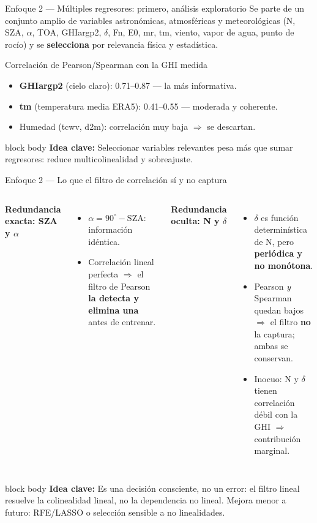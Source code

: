 \documentclass[aspectratio=169,11pt]{beamer}
\newcommand{\clave}[1]{%
  \begin{beamercolorbox}[wd=\linewidth,sep=6pt,rounded=true]{block body}%
    \footnotesize\textbf{\color{primary}Idea clave: }#1%
  \end{beamercolorbox}}
\begin{document}
\begin{frame}{Enfoque 2 — Múltiples regresores: primero, análisis exploratorio}
  \footnotesize
  Se parte de un conjunto amplio de variables astronómicas, atmosféricas y meteorológicas (N, SZA, $\alpha$, TOA, GHIargp2, $\delta$, Fn, E0, mr, tm, viento, vapor de agua, punto de rocío) y se \textbf{selecciona} por relevancia física y estadística.
  \vspace{0.4em}
  \begin{block}{Correlación de Pearson/Spearman con la GHI medida}
    \scriptsize
    \begin{itemize}
      \item \textbf{GHIargp2} (cielo claro): 0.71–0.87 — la más informativa.
      \item \textbf{tm} (temperatura media ERA5): 0.41–0.55 — moderada y coherente.
      \item Humedad (tcwv, d2m): correlación muy baja $\Rightarrow$ se descartan.
    \end{itemize}
  \end{block}
  \clave{Seleccionar variables relevantes pesa más que sumar regresores: reduce multicolinealidad y sobreajuste.}
\end{frame}

\begin{frame}{Enfoque 2 — Lo que el filtro de correlación sí y no captura}
  \footnotesize
  \begin{columns}[T]
    \textbf{Redundancia exacta: SZA y $\alpha$}
    \begin{itemize}
      \item $\alpha = 90^\circ - \mathrm{SZA}$: información idéntica.
      \item Correlación lineal perfecta $\Rightarrow$ el filtro de Pearson \textbf{la detecta y elimina una} antes de entrenar.
    \end{itemize}
    \textbf{Redundancia oculta: N y $\delta$}
    \begin{itemize}
      \item $\delta$ es función determinística de N, pero \textbf{periódica y no monótona}.
      \item Pearson \emph{y} Spearman quedan bajos $\Rightarrow$ el filtro \textbf{no} la captura; ambas se conservan.
      \item Inocuo: N y $\delta$ tienen correlación débil con la GHI $\Rightarrow$ contribución marginal.
    \end{itemize}
  \end{columns}
  \vspace{0.3em}
  \clave{Es una decisión consciente, no un error: el filtro lineal resuelve la colinealidad lineal, no la dependencia no lineal. Mejora menor a futuro: RFE/LASSO o selección sensible a no linealidades.}
\end{frame}
\end{document}
